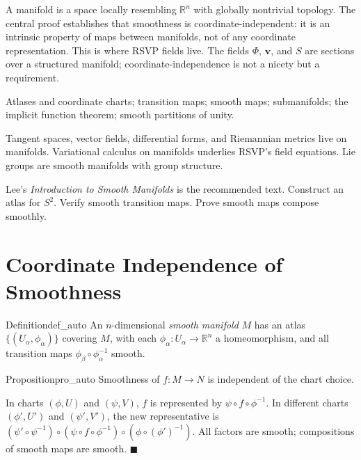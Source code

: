 \documentclass[12pt, twoside, openright, a4paper]{book}
\renewenvironment{proof}{%
  \par\medskip\noindent{\color{RSVPgreen}\bfseries\sffamily Proof.}\enspace\ignorespaces
}{\hfill{\color{RSVPgreen}$\blacksquare$}\par\medskip}
\newcommand{\R}{\mathbb{R}}
\begin{document}
\begin{motivation}
A manifold is a space locally resembling $\R^n$ with globally nontrivial topology.
The central proof establishes that smoothness is coordinate-independent: it is an intrinsic property of maps between manifolds, not of any coordinate representation.
This is where RSVP fields live.
The fields $\Phi$, $\mathbf{v}$, and $S$ are sections over a structured manifold; coordinate-independence is not a nicety but a requirement.
\end{motivation}

\begin{structures}
Atlases and coordinate charts; transition maps; smooth maps; submanifolds; the implicit function theorem; smooth partitions of unity.
\end{structures}

\begin{dependencies}
Tangent spaces, vector fields, differential forms, and Riemannian metrics live on manifolds.
Variational calculus on manifolds underlies RSVP's field equations.
Lie groups are smooth manifolds with group structure.
\end{dependencies}

\begin{exercises_box}
Lee's \textit{Introduction to Smooth Manifolds} is the recommended text.
Construct an atlas for $S^2$.
Verify smooth transition maps.
Prove smooth maps compose smoothly.
\end{exercises_box}

\section{Coordinate Independence of Smoothness}

\begin{definition}{Definition}{def_auto}
An $n$-dimensional \emph{smooth manifold} $M$ has an atlas $\{(U_\alpha, \phi_\alpha)\}$ covering $M$, with each $\phi_\alpha: U_\alpha \to \R^n$ a homeomorphism, and all transition maps $\phi_\beta \circ \phi_\alpha^{-1}$ smooth.
\end{definition}

\begin{proposition}{Proposition}{pro_auto}
Smoothness of $f: M \to N$ is independent of the chart choice.
\end{proposition}
\begin{proof}
In charts $(\phi, U)$ and $(\psi, V)$, $f$ is represented by $\psi \circ f \circ \phi^{-1}$.
In different charts $(\phi',U')$ and $(\psi',V')$, the new representative is $(\psi' \circ \psi^{-1}) \circ (\psi \circ f \circ \phi^{-1}) \circ (\phi \circ (\phi')^{-1})$.
All factors are smooth; compositions of smooth maps are smooth.
\end{proof}
\end{document}
